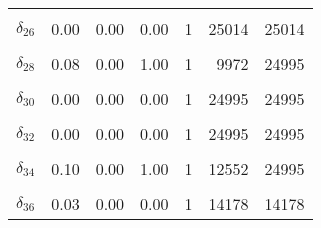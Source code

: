 \begin{longtable}[t]{lrrrrrr}
\cellcolor{gray!6}{$\delta_{25}$} & \cellcolor{gray!6}{0.27} & \cellcolor{gray!6}{0.00} & \cellcolor{gray!6}{1.00} & \cellcolor{gray!6}{1} & \cellcolor{gray!6}{7342} & \cellcolor{gray!6}{24995}\\
$\delta_{26}$ & 0.00 & 0.00 & 0.00 & 1 & 25014 & 25014\\
\cellcolor{gray!6}{$\delta_{27}$} & \cellcolor{gray!6}{0.28} & \cellcolor{gray!6}{0.00} & \cellcolor{gray!6}{1.00} & \cellcolor{gray!6}{1} & \cellcolor{gray!6}{10629} & \cellcolor{gray!6}{24995}\\
$\delta_{28}$ & 0.08 & 0.00 & 1.00 & 1 & 9972 & 24995\\
\cellcolor{gray!6}{$\delta_{29}$} & \cellcolor{gray!6}{0.17} & \cellcolor{gray!6}{0.00} & \cellcolor{gray!6}{1.00} & \cellcolor{gray!6}{1} & \cellcolor{gray!6}{13883} & \cellcolor{gray!6}{24995}\\
$\delta_{30}$ & 0.00 & 0.00 & 0.00 & 1 & 24995 & 24995\\
\cellcolor{gray!6}{$\delta_{31}$} & \cellcolor{gray!6}{0.67} & \cellcolor{gray!6}{0.00} & \cellcolor{gray!6}{1.00} & \cellcolor{gray!6}{1} & \cellcolor{gray!6}{2484} & \cellcolor{gray!6}{24995}\\
$\delta_{32}$ & 0.00 & 0.00 & 0.00 & 1 & 24995 & 24995\\
\cellcolor{gray!6}{$\delta_{33}$} & \cellcolor{gray!6}{0.00} & \cellcolor{gray!6}{0.00} & \cellcolor{gray!6}{0.00} & \cellcolor{gray!6}{1} & \cellcolor{gray!6}{21870} & \cellcolor{gray!6}{21870}\\
$\delta_{34}$ & 0.10 & 0.00 & 1.00 & 1 & 12552 & 24995\\
\cellcolor{gray!6}{$\delta_{35}$} & \cellcolor{gray!6}{0.00} & \cellcolor{gray!6}{0.00} & \cellcolor{gray!6}{0.00} & \cellcolor{gray!6}{1} & \cellcolor{gray!6}{24995} & \cellcolor{gray!6}{24995}\\
$\delta_{36}$ & 0.03 & 0.00 & 0.00 & 1 & 14178 & 14178\\*
\end{longtable}